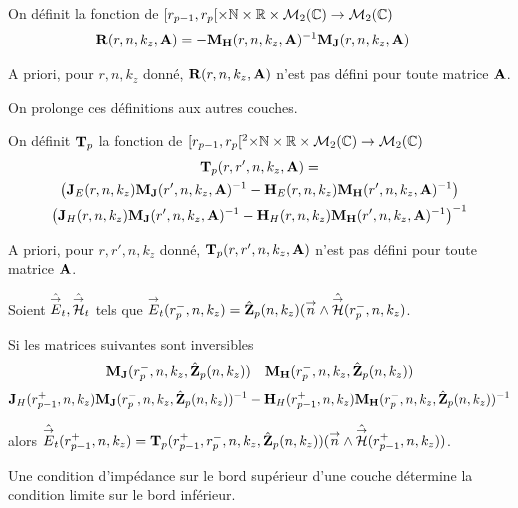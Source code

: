     \begin{defn}
      \label{def:cylindre:reflexion:impedance}
      On définit la fonction de \([r_{p-1}, r_p[\times \mathbb N \times \mathbb R \times \mathcal{M}_{2}(\mathbb C) \rightarrow \mathcal{M}_{2}(\mathbb C)\)
      \begin{align*}
        \mathbf{R}(r,n,k_z,\mathbf{A}) &= -\mathbf{M}_{\mathbf{H}}(r,n,k_z,\mathbf{A})^{-1}\mathbf{M}_{\mathbf{J}}(r,n,k_z,\mathbf{A})
      \end{align*}
    \end{defn}
    A priori, pour \(r,n,k_z\) donné, \(\mathbf{R}(r,n,k_z,\mathbf{A})\) n'est pas défini pour toute matrice \(\mathbf{A}\).

    On prolonge ces définitions aux autres couches.

    \begin{defn}%
      \label{def:cylindre:transfert:impedance}

      On définit \(\mathbf{T}_p\) la fonction de \([r_{p-1}, r_p[^2\times\mathbb N\times\mathbb R\times\mathcal{M}_2(\mathbb C)\rightarrow \mathcal{M}_{2}(\mathbb C)\)
      \begin{multline*}
        \mathbf{T}_p(r,r',n,k_z,\mathbf{A}) = \\
          \left(\mathbf{J}_{E}(r,n,k_z)\mathbf{M}_{\mathbf{J}}(r',n,k_z,\mathbf{A})^{-1} - \mathbf{H}_{E}(r,n,k_z)\mathbf{M}_{\mathbf{H}}(r',n,k_z,\mathbf{A})^{-1}\right) 
          \\
          \left(\mathbf{J}_{H}(r,n,k_z)\mathbf{M}_{\mathbf{J}}(r',n,k_z,\mathbf{A})^{-1} - \mathbf{H}_{H}(r,n,k_z)\mathbf{M}_{\mathbf{H}}(r',n,k_z,\mathbf{A})^{-1}\right)^{-1}
      \end{multline*}
    \end{defn}
    A priori, pour \(r,r',n,k_z\) donné, \(\mathbf{T}_p(r,r',n,k_z,\mathbf{A})\) n'est pas défini pour toute matrice \(\mathbf{A}\).

    \begin{prop}%
      \label{prop:cylindre:transfert:impedance}

      Soient \(\hat{{\overset{\rightarrow}{E}}}_t,\hat{{\overset{\rightarrow}{\mathcal{H}}}}_t\) tels que \({\overset{\rightarrow}{E}}_t(r_{p}^-,n,k_z) = \hat{\mathbf{Z}}_{p}(n,k_z)({\overset{\rightarrow}{n}} \wedge \hat{{\overset{\rightarrow}{\mathcal{H}}}}(r_{p}^-,n,k_z)\).

      Si les matrices suivantes sont inversibles
      \begin{align*}
        \mathbf{M}_{\mathbf{J}}(r_p^-,n,k_z,\hat{\mathbf{Z}}_{p}(n,k_z)) && \mathbf{M}_{\mathbf{H}}(r_p^-,n,k_z,\hat{\mathbf{Z}}_{p}(n,k_z))
      \end{align*}
      \begin{align*}
        \mathbf{J}_{H}(r_{p-1}^+,n,k_z)\mathbf{M}_{\mathbf{J}}(r_{p}^-,n,k_z,\hat{\mathbf{Z}}_{p}(n,k_z))^{-1} - \mathbf{H}_{H}(r_{p-1}^+,n,k_z)\mathbf{M}_{\mathbf{H}}(r_{p}^-,n,k_z,\hat{\mathbf{Z}}_{p}(n,k_z))^{-1}
      \end{align*}

      alors \(\hat{{\overset{\rightarrow}{E}}}_t(r_{p-1}^+,n,k_z) = \mathbf{T}_p(r_{p-1}^+,r_{p}^-,n,k_z,\hat{\mathbf{Z}}_{p}(n,k_z))({\overset{\rightarrow}{n}} \wedge \hat{{\overset{\rightarrow}{\mathcal{H}}}}(r_{p-1}^+,n,k_z))\).

      Une condition d'impédance sur le bord supérieur d'une couche détermine la condition limite sur le bord inférieur.
    \end{prop}


